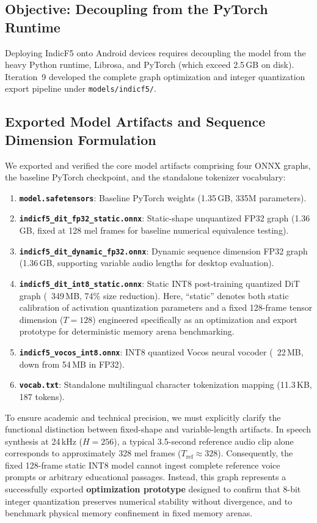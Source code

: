\subsection{Objective: Decoupling from the PyTorch Runtime}
Deploying IndicF5 onto Android devices requires decoupling the model from the heavy Python runtime, Librosa, and PyTorch (which exceed 2.5\,GB on disk). Iteration~9 developed the complete graph optimization and integer quantization export pipeline under \texttt{models/indicf5/}.

\subsection{Exported Model Artifacts and Sequence Dimension Formulation}
We exported and verified the core model artifacts comprising four ONNX graphs, the baseline PyTorch checkpoint, and the standalone tokenizer vocabulary:
\begin{enumerate}
    \item \textbf{\texttt{model.safetensors}}: Baseline PyTorch weights (1.35\,GB, 335M parameters).
    \item \textbf{\texttt{indicf5\_dit\_fp32\_static.onnx}}: Static-shape unquantized FP32 graph (1.36\,GB, fixed at 128 mel frames for baseline numerical equivalence testing).
    \item \textbf{\texttt{indicf5\_dit\_dynamic\_fp32.onnx}}: Dynamic sequence dimension FP32 graph (1.36\,GB, supporting variable audio lengths for desktop evaluation).
    \item \textbf{\texttt{indicf5\_dit\_int8\_static.onnx}}: Static INT8 post-training quantized DiT graph (~349\,MB, 74\% size reduction). Here, ``static'' denotes both static calibration of activation quantization parameters and a fixed 128-frame tensor dimension ($T=128$) engineered specifically as an optimization and export prototype for deterministic memory arena benchmarking.
    \item \textbf{\texttt{indicf5\_vocos\_int8.onnx}}: INT8 quantized Vocos neural vocoder (~22\,MB, down from 54\,MB in FP32).
    \item \textbf{\texttt{vocab.txt}}: Standalone multilingual character tokenization mapping (11.3\,KB, 187 tokens).
\end{enumerate}

To ensure academic and technical precision, we must explicitly clarify the functional distinction between fixed-shape and variable-length artifacts. In speech synthesis at 24\,kHz ($H=256$), a typical 3.5-second reference audio clip alone corresponds to approximately 328 mel frames ($T_{\text{ref}} \approx 328$). Consequently, the fixed 128-frame static INT8 model cannot ingest complete reference voice prompts or arbitrary educational passages. Instead, this graph represents a successfully exported \textbf{optimization prototype} designed to confirm that 8-bit integer quantization preserves numerical stability without divergence, and to benchmark physical memory confinement in fixed memory arenas. 

